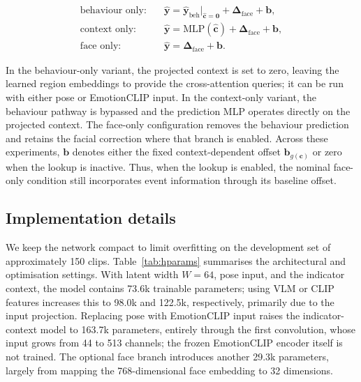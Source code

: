 \documentclass[11pt]{article}
\newcommand{\vc}{\mathbf{c}}
\newcommand{\vchat}{\hat{\mathbf{c}}}
\newcommand{\vy}{\hat{\mathbf{y}}}
\newcommand{\vb}{\mathbf{b}}
\begin{document}
\begin{align}
  \text{behaviour only:}\quad & \vy = \vy_{\text{beh}}\big|_{\vchat=\mathbf{0}} + \bm{\Delta}_{\text{face}} + \vb, \\
  \text{context only:}\quad & \vy = \mathrm{MLP}(\vchat) + \bm{\Delta}_{\text{face}} + \vb, \\
  \text{face only:}\quad & \vy = \bm{\Delta}_{\text{face}} + \vb.
\end{align}

In the behaviour-only variant, the projected context is set to zero, leaving the learned region embeddings to provide the cross-attention queries; it can be run with either pose or EmotionCLIP input. In the context-only variant, the behaviour pathway is bypassed and the prediction MLP operates directly on the projected context. The face-only configuration removes the behaviour prediction and retains the facial correction where that branch is enabled. Across these experiments, $\vb$ denotes either the fixed context-dependent offset $\vb_{g(\vc)}$ or zero when the lookup is inactive. Thus, when the lookup is enabled, the nominal face-only condition still incorporates event information through its baseline offset.

\subsection{Implementation details}
\label{sec:impl}

We keep the network compact to limit overfitting on the development set of approximately 150 clips. Table~\ref{tab:hparams} summarises the architectural and optimisation settings. With latent width $W=64$, pose input, and the indicator context, the model contains 73.6k trainable parameters; using VLM or CLIP features increases this to 98.0k and 122.5k, respectively, primarily due to the input projection. Replacing pose with EmotionCLIP input raises the indicator-context model to 163.7k parameters, entirely through the first convolution, whose input grows from 44 to 513 channels; the frozen EmotionCLIP encoder itself is not trained. The optional face branch introduces another 29.3k parameters, largely from mapping the 768-dimensional face embedding to 32 dimensions.
\end{document}
